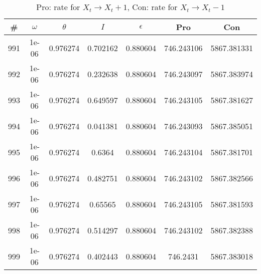 \newpage
\begin{table}
\caption{Pro: rate for $X_t \rightarrow X_t + 1$, Con: rate for $X_t \rightarrow X_t - 1$}
\begin{tabular*}{\linewidth}{c|c|c|c|c|c|c}
\# & $\omega$ & $\theta$ & $I$ & $\epsilon$ & Pro & Con \\
\hline
991 & 1e-06 & 0.976274 & 0.702162 & 0.880604 & 746.243106 & 5867.381331\\
992 & 1e-06 & 0.976274 & 0.232638 & 0.880604 & 746.243097 & 5867.383974\\
993 & 1e-06 & 0.976274 & 0.649597 & 0.880604 & 746.243105 & 5867.381627\\
994 & 1e-06 & 0.976274 & 0.041381 & 0.880604 & 746.243093 & 5867.385051\\
995 & 1e-06 & 0.976274 & 0.6364 & 0.880604 & 746.243104 & 5867.381701\\
996 & 1e-06 & 0.976274 & 0.482751 & 0.880604 & 746.243102 & 5867.382566\\
997 & 1e-06 & 0.976274 & 0.65565 & 0.880604 & 746.243105 & 5867.381593\\
998 & 1e-06 & 0.976274 & 0.514297 & 0.880604 & 746.243102 & 5867.382388\\
999 & 1e-06 & 0.976274 & 0.402443 & 0.880604 & 746.2431 & 5867.383018\\
\end{tabular*}
\end{table}